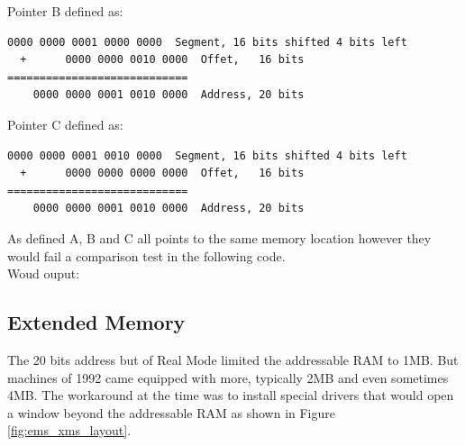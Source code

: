 \documentclass[book.tex]{subfiles}
\begin{document}
\bigskip

Pointer B defined as:
\begin{Verbatim}[fontsize=\relsize{-1}]
    0000 0000 0001 0000 0000  Segment, 16 bits shifted 4 bits left  
  +      0000 0000 0010 0000  Offet,   16 bits
============================
    0000 0000 0001 0010 0000  Address, 20 bits
\end{Verbatim}

\bigskip

Pointer C defined as:
\begin{Verbatim}[fontsize=\relsize{-1}]
    0000 0000 0001 0010 0000  Segment, 16 bits shifted 4 bits left  
  +      0000 0000 0000 0000  Offet,   16 bits
============================
    0000 0000 0001 0010 0000  Address, 20 bits
\end{Verbatim}

As defined A, B and C all points to the same memory location however they would fail a comparison test in the following code.\\



Woud ouput:




\bigskip





  \subsection{Extended Memory}

The 20 bits address but of Real Mode limited the addressable RAM to 1MB. But machines of 1992 came equipped with more, typically 2MB and even sometimes 4MB. The workaround at the time was to install special drivers that would open a window beyond the addressable RAM as shown in Figure \ref{fig:ems_xms_layout}.
\end{document}
